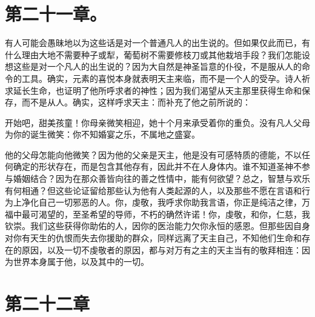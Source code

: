 \par


\section{第二十一章。}

有人可能会愚昧地以为这些话是对一个普通凡人的出生说的。但如果仅此而已，有什么理由大地不需要种子或犁，葡萄树不需要修枝刀或其他栽培手段？我们怎能设想这些是对一个凡人的出生说的？因为大自然是神圣旨意的仆役，不是服从人的命令的工具。确实，元素的喜悦本身就表明天主来临，而不是一个人的受孕。诗人祈求延长生命，也证明了他所呼求者的神性；因为我们渴望从天主那里获得生命和保存，而不是从人。确实，这样呼求天主：而补充了他之前所说的：\par

开始吧，甜美孩童！你母亲微笑相迎，\newline{}她十个月来承受着你的重负。\newline{}没有凡人父母为你的诞生微笑：\newline{}你不知婚宴之乐，不属地之盛宴。\par

他的父母怎能向他微笑？因为他的父亲是天主，他是没有可感特质的德能，不以任何确定的形状存在，而是包含其他存有，因此并不在人身体内。谁不知道圣神不参与婚姻结合？因为在那众善皆向往的善之性情中，能有何欲望？总之，智慧与欢乐有何相通？但这些论证留给那些认为他有人类起源的人，以及那些不愿在言语和行为上净化自己一切邪恶的人。你，虔敬，我呼求你助我言语，你正是纯洁之律，万福中最可渴望的，至圣希望的导师，不朽的确然许诺！你，虔敬，和你，仁慈，我钦崇。我们这些获得你助佑的人，因你的医治能力欠你永恒的感恩。但那些因自身对你有天生的仇恨而失去你援助的群众，同样远离了天主自己，不知他们生命和存在的原因，以及一切不虔敬者的原因，都与对万有之主的天主当有的敬拜相连：因为世界本身属于他，以及其中的一切。\par


\section{第二十二章　}

